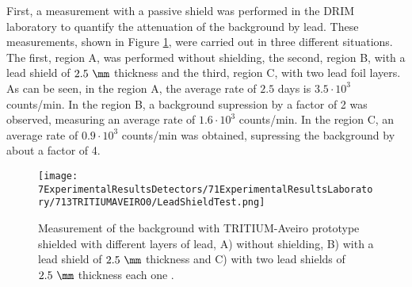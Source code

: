

First, a measurement with a passive shield was performed in the DRIM laboratory to quantify the attenuation of the background by lead. These measurements, shown in Figure \ref{fig:LeadShieldTest}, were carried out in three different situations. The first, region A, was performed without shielding, the second, region B, with a lead shield of $2.5~\mm$ thickness and the third, region C, with two lead foil layers. As can be seen, in the region A, the average rate of $2.5$ days is $3.5 \cdot{} 10^3$ counts/min. In the region B, a background supression by a factor of 2 was observed, measuring an average rate of $1.6 \cdot{} 10^3$ counts/min. In the region C, an average rate of $0.9 \cdot{} 10^3$ counts/min was obtained, supressing the background by about a factor of 4.

\begin{figure}[h]
\centering
\texttt{[image: 7ExperimentalResultsDetectors/71ExperimentalResultsLaboratory/713TRITIUMAVEIRO0/LeadShieldTest.png]}
\caption{Measurement of the background with TRITIUM-Aveiro prototype shielded with different layers of lead, A) without shielding, B) with a lead shield of $2.5~\mm$ thickness and C) with two lead shields of $2.5~\mm$ thickness each one \cite{ExperimentalPaperCarlos}.\label{fig:LeadShieldTest}}
\end{figure}

